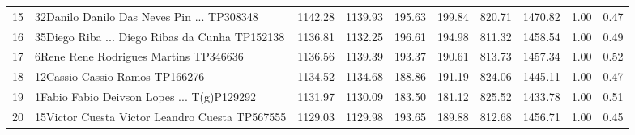 \begin{table}[ht]
\begin{tabular}{rlrrrrrrrr}
  15 & 32Danilo Danilo Das Neves Pin ... TP308348 & 1142.28 & 1139.93 & 195.63 & 199.84 & 820.71 & 1470.82 & 1.00 & 0.47 \\ 
  16 & 35Diego Riba ... Diego Ribas da Cunha TP152138 & 1136.81 & 1132.25 & 196.61 & 194.98 & 811.32 & 1458.54 & 1.00 & 0.49 \\ 
  17 & 6Rene Rene Rodrigues Martins TP346636 & 1136.56 & 1139.39 & 193.37 & 190.61 & 813.73 & 1457.34 & 1.00 & 0.52 \\ 
  18 & 12Cassio Cassio Ramos TP166276 & 1134.52 & 1134.68 & 188.86 & 191.19 & 824.06 & 1445.11 & 1.00 & 0.47 \\ 
  19 & 1Fabio Fabio Deivson Lopes  ... T(g)P129292 & 1131.97 & 1130.09 & 183.50 & 181.12 & 825.52 & 1433.78 & 1.00 & 0.51 \\ 
  20 & 15Victor Cuesta Victor Leandro Cuesta TP567555 & 1129.03 & 1129.98 & 193.65 & 189.88 & 812.68 & 1456.71 & 1.00 & 0.45 \\ 
   \hline
\end{tabular}
\end{table}
